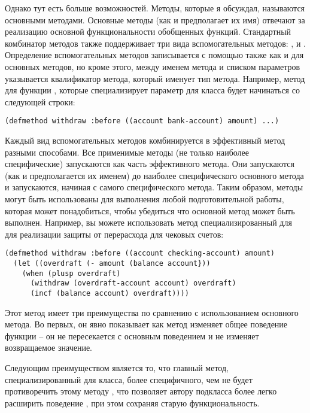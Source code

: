 Однако тут есть больше возможностей.  Методы, которые я обсуждал, называются основными
методами.  Основные методы (как и предполагает их имя) отвечают за реализацию основной
функциональности обобщенных функций.  Стандартный комбинатор методов также поддерживает
три вида вспомогательных методов: ,  и .
Определение вспомогательных методов записывается с помощью  также как и
для основных методов, но кроме этого, между именем метода и списком параметров указывается
квалификатор метода, который именует тип метода.  Например, метод  для
функции , которые специализирует параметр  для класса
 будет начинаться со следующей строки:

\begin{lstlisting}
(defmethod withdraw :before ((account bank-account) amount) ...)
\end{lstlisting}

Каждый вид вспомогательных методов комбинируется в эффективный метод разными способами.
Все применимые методы  (не только наиболее специфические) запускаются как
часть эффективного метода.  Они запускаются (как и предполагается их именем) до наиболее
специфического основного метода и запускаются, начиная с самого специфического метода.
Таким образом, методы  могут быть использованы для выполнения любой
подготовительной работы, которая может понадобиться, чтобы убедиться что основной метод
может быть выполнен.  Например, вы можете использовать метод 
специализированный для  для реализации защиты от перерасхода для
чековых счетов:

\begin{lstlisting}
(defmethod withdraw :before ((account checking-account) amount)
  (let ((overdraft (- amount (balance account}))
    (when (plusp overdraft)
      (withdraw (overdraft-account account) overdraft)
      (incf (balance account) overdraft))))
\end{lstlisting}

Этот метод  имеет три преимущества по сравнению с использованием основного
метода.  Во первых, он явно показывает как метод изменяет общее поведение функции
 -- он не пересекается с основным поведением и не изменяет возвращаемое
значение.

Следующим преимуществом является то, что главный метод, специализированный для класса,
более специфичного, чем  не будет противоречить этому методу
, что позволяет автору подкласса  более легко
расширить поведение , при этом сохраняя старую функциональность.

